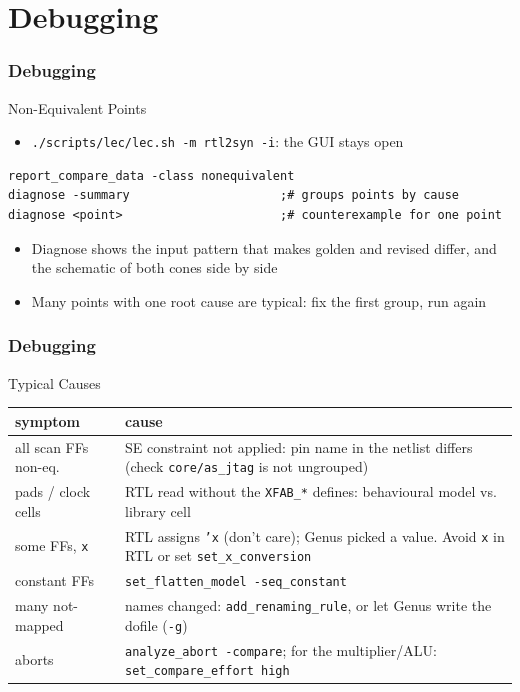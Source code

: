 \documentclass{beamer}
\newcommand{\astitle}{nix}
\newcommand{\assubtitle}{nix}
\newcommand{\cmd}[1]{\texttt{#1}}
\begin{document}
\section{Debugging}
\renewcommand{\astitle}{Debugging}

\renewcommand{\assubtitle}{Non-Equivalent Points}
\begin{frame}[fragile]
\frametitle{\astitle}
\begin{block}{\assubtitle}
  \begin{itemize}
    \item \cmd{./scripts/lec/lec.sh -m rtl2syn -i}: the GUI stays open
  \end{itemize}
\begin{lstlisting}[style=sh]
report_compare_data -class nonequivalent
diagnose -summary                     ;# groups points by cause
diagnose <point>                      ;# counterexample for one point
\end{lstlisting}
  \begin{itemize}
    \item Diagnose shows the input pattern that makes golden and revised
      differ, and the schematic of both cones side by side
    \item Many points with one root cause are typical: fix the first
      group, run again
  \end{itemize}
\end{block}
\end{frame}

\renewcommand{\assubtitle}{Typical Causes}
\begin{frame}
\frametitle{\astitle}
\begin{block}{\assubtitle}
  \footnotesize
  \begin{tabularx}{\linewidth}{@{}lY@{}}
    \textbf{symptom} & \textbf{cause}\\\hline
    all scan FFs non-eq. & SE constraint not applied: pin name in the
                          netlist differs (check \cmd{core/as\_jtag} is
                          not ungrouped)\\
    pads / clock cells   & RTL read without the \cmd{XFAB\_*} defines:
                          behavioural model vs. library cell\\
    some FFs, \cmd{x}   & RTL assigns \cmd{'x} (don't care); Genus picked
                          a value. Avoid \cmd{x} in RTL or set
                          \cmd{set\_x\_conversion}\\
    constant FFs         & \cmd{set\_flatten\_model -seq\_constant}\\
    many not-mapped      & names changed: \cmd{add\_renaming\_rule}, or
                          let Genus write the dofile (\cmd{-g})\\
    aborts               & \cmd{analyze\_abort -compare}; for the
                          multiplier/ALU: \cmd{set\_compare\_effort high}\\
  \end{tabularx}
\end{block}
\end{frame}
\end{document}
